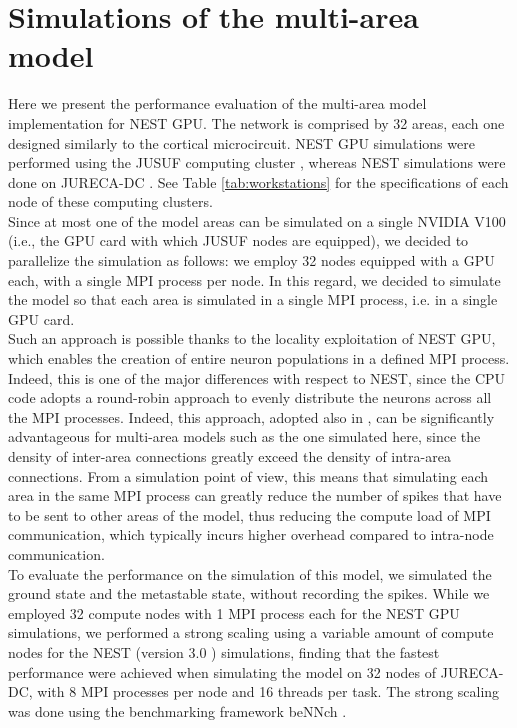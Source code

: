 \documentclass[a4paper, 12pt, twoside, openright]{book}
\begin{document}
\section{Simulations of the multi-area model}
Here we present the performance evaluation of the multi-area model implementation for NEST GPU.
The network is comprised by 32 areas, each one designed similarly to the cortical microcircuit. NEST GPU simulations were performed using the JUSUF computing cluster \cite{JUSUF}, whereas NEST simulations were done on JURECA-DC \cite{JURECA}. See Table \ref{tab:workstations} for the specifications of each node of these computing clusters.\\
Since at most one of the model areas can be simulated on a single NVIDIA V100 (i.e., the GPU card with which JUSUF nodes are equipped), we decided to parallelize the simulation as follows: we employ 32 nodes equipped with a GPU each, with a single MPI process per node. In this regard, we decided to simulate the model so that each area is simulated in a single MPI process, i.e. in a single GPU card.\\
Such an approach is possible thanks to the locality exploitation of NEST GPU, which enables the creation of entire neuron populations in a defined MPI process. Indeed, this is one of the major differences with respect to NEST, since the CPU code adopts a round-robin approach to evenly distribute the neurons across all the MPI processes. Indeed, this approach, adopted also in \cite{Pastorelli2019}, can be significantly advantageous for multi-area models such as the one simulated here, since the density of inter-area connections greatly exceed the density of intra-area connections. From a simulation point of view, this means that simulating each area in the same MPI process can greatly reduce the number of spikes that have to be sent to other areas of the model, thus reducing the compute load of MPI communication, which typically incurs higher overhead compared to intra-node communication.\\
To evaluate the performance on the simulation of this model, we simulated the ground state and the metastable state, without recording the spikes. While we employed 32 compute nodes with 1 MPI process each for the NEST GPU simulations, we performed a strong scaling using a variable amount of compute nodes for the NEST (version 3.0 \cite{nest3.0}) simulations, finding that the fastest performance were achieved when simulating the model on 32 nodes of JURECA-DC, with 8 MPI processes per node and 16 threads per task. The strong scaling was done using the benchmarking framework beNNch \cite{Albers2022}.\\
\end{document}
